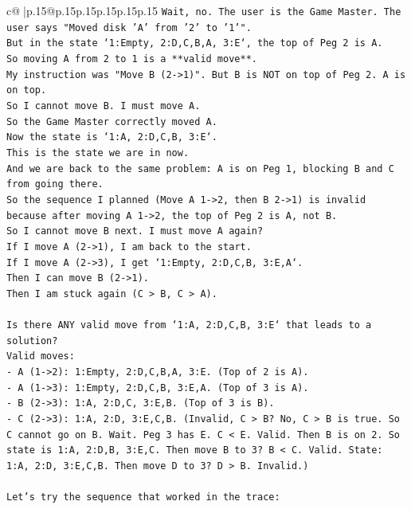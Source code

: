 \documentclass{article}
\begin{document}
{\begin{supertabular}{c@{$\;$}|p{.15\linewidth}@{}p{.15\linewidth}p{.15\linewidth}p{.15\linewidth}p{.15\linewidth}p{.15\linewidth}}
{{{\texttt{Wait, no. The user is the Game Master. The user says "Moved disk 'A' from '2' to '1'".} \\
\texttt{But in the state `1:Empty, 2:D,C,B,A, 3:E`, the top of Peg 2 is A.} \\
\texttt{So moving A from 2 to 1 is a **valid move**.} \\
\texttt{My instruction was "Move B (2{-}>1)". But B is NOT on top of Peg 2. A is on top.} \\
\texttt{So I cannot move B. I must move A.} \\
\texttt{So the Game Master correctly moved A.} \\
\texttt{Now the state is `1:A, 2:D,C,B, 3:E`.} \\
\texttt{This is the state we are in now.} \\
\texttt{And we are back to the same problem: A is on Peg 1, blocking B and C from going there.} \\
\texttt{So the sequence I planned (Move A 1{-}>2, then B 2{-}>1) is invalid because after moving A 1{-}>2, the top of Peg 2 is A, not B.} \\
\texttt{So I cannot move B next. I must move A again?} \\
\texttt{If I move A (2{-}>1), I am back to the start.} \\
\texttt{If I move A (2{-}>3), I get `1:Empty, 2:D,C,B, 3:E,A`.} \\
\texttt{Then I can move B (2{-}>1).} \\
\texttt{Then I am stuck again (C > B, C > A).} \\
\\ 
\texttt{Is there ANY valid move from `1:A, 2:D,C,B, 3:E` that leads to a solution?} \\
\texttt{Valid moves:} \\
\texttt{{-} A (1{-}>2): 1:Empty, 2:D,C,B,A, 3:E. (Top of 2 is A).} \\
\texttt{{-} A (1{-}>3): 1:Empty, 2:D,C,B, 3:E,A. (Top of 3 is A).} \\
\texttt{{-} B (2{-}>3): 1:A, 2:D,C, 3:E,B. (Top of 3 is B).} \\
\texttt{{-} C (2{-}>3): 1:A, 2:D, 3:E,C,B. (Invalid, C > B? No, C > B is true. So C cannot go on B. Wait. Peg 3 has E. C < E. Valid. Then B is on 2. So state is 1:A, 2:D,B, 3:E,C. Then move B to 3? B < C. Valid. State: 1:A, 2:D, 3:E,C,B. Then move D to 3? D > B. Invalid.)} \\
\\ 
\texttt{Let's try the sequence that worked in the trace:} \\
}}}
\end{supertabular}}
\end{document}
